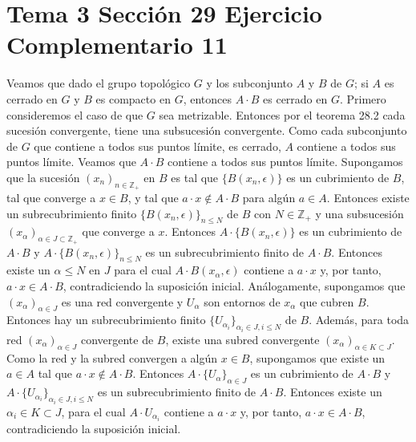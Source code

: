 \documentclass{article}
\begin{document}
\section{Tema 3 Sección 29 Ejercicio Complementario 11}
Veamos que dado el grupo topológico $G$ y los subconjunto $A$ y $B$ de $G$; si $A$ es cerrado en $G$ y $B$ es compacto en $G$, entonces $A\cdot B$ es cerrado en $G$.
Primero consideremos el caso de que $G$ sea metrizable. Entonces por el teorema 28.2 cada sucesión convergente, tiene una subsucesión convergente. Como cada subconjunto de $G$ que contiene a todos sus puntos límite, es cerrado, $A$ contiene a todos sus puntos límite. Veamos que $A\cdot B$ contiene a todos sus puntos límite. Supongamos que la sucesión $(x_n)_{n\in \mathbb{Z}_+}$ en $B$ es tal que $\{B(x_n,\epsilon)\}$ es un cubrimiento de $B$, tal que converge a $x\in B$, y tal que $a\cdot x\notin A\cdot B$ para algún $a\in A$. Entonces existe un subrecubrimiento finito $\{B(x_n,\epsilon)\}_{n \leq N}$ de $B$ con $N\in \mathbb{Z}_+$ y una subsucesión $(x_\alpha)_{\alpha\in J\subset \mathbb{Z}_+}$ que converge a $x$. Entonces $A\cdot \{B(x_n,\epsilon)\}$ es un cubrimiento de $A\cdot B$ y $A\cdot \{B(x_n,\epsilon)\}_{n \leq N}$ es un subrecubrimiento finito de $A\cdot B$. Entonces existe un $\alpha\leq N$ en $J$ para el cual $A\cdot B(x_\alpha,\epsilon)$  contiene a $a\cdot x$ y, por tanto, $a\cdot x\in A\cdot B$, contradiciendo la suposición inicial. Análogamente, supongamos que $(x_\alpha)_{\alpha \in J}$ es una red  convergente y $U_\alpha$ son entornos de $x_\alpha$ que cubren $B$. Entonces hay un subrecubrimiento finito $\{U_{\alpha_i}\}_{\alpha_i\in J,i\leq N}$ de $B$. Además, para toda red $(x_\alpha)_{\alpha \in J}$ convergente de $B$, existe una subred convergente $(x_\alpha)_{\alpha \in K\subset J}$. Como la red y la subred convergen a algún $x\in B$, supongamos que existe un $a\in A$ tal que $a\cdot x\notin A\cdot B$. Entonces $A\cdot \{U_\alpha\}_{\alpha \in J}$ es un cubrimiento de $A\cdot B$ y $A\cdot\{U_{\alpha_i}\}_{\alpha_i\in J,i\leq N}$ es un subrecubrimiento finito de $A\cdot B$. Entonces existe un $\alpha_i\in K\subset J$, para el cual $A\cdot U_{\alpha_i}$  contiene a $a\cdot x$ y, por tanto, $a\cdot x\in A\cdot B$, contradiciendo la suposición inicial.
\end{document}
